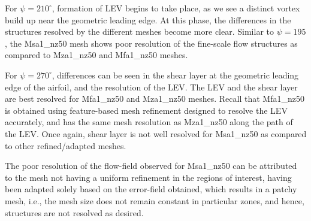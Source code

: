 



For $\psi=210^\circ$, formation of LEV begins to take place, as we see a distinct vortex build up near the geometric leading edge. 
At this phase, the differences in the structures resolved by the different meshes become more clear.
Similar to $\psi=195$, the Msa1\_nz50 mesh shows poor resolution of the fine-scale flow structures as compared to  Mza1\_nz50 and Mfa1\_nz50 meshes.

For $\psi=270^\circ$, differences can be seen in the shear layer at the geometric leading edge of the airfoil, and the resolution of the LEV. 
The LEV and the shear layer are best resolved for Mfa1\_nz50 and Mza1\_nz50 meshes. 
Recall that Mfa1\_nz50 is obtained using feature-based mesh refinement designed to resolve the LEV accurately, and has the same mesh resolution as Mza1\_nz50 along the path of the LEV. 
Once again, shear layer is not well resolved for Msa1\_nz50 as compared to other refined/adapted meshes.

The poor resolution of the flow-field observed for Msa1\_nz50 can be attributed to the mesh not having a uniform refinement in the regions of interest, having been adapted solely based on the error-field obtained, which results in a patchy mesh, i.e., the mesh size does not remain constant in particular zones, and hence, structures are not resolved as desired.

